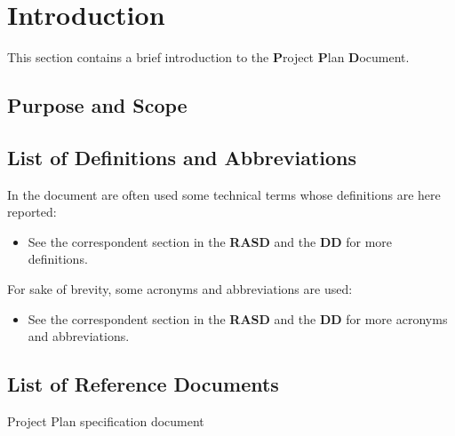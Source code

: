 \section{Introduction}
This section contains a brief introduction to the \textbf{P}roject \textbf{P}lan \textbf{D}ocument.
%
\subsection{Purpose and Scope}
\lipsum[100]
%
\subsection{List of Definitions and Abbreviations}
In the document are often used some technical terms whose definitions are here reported:
\begin{itemize}
	\item See the correspondent section in the \textbf{RASD} and the \textbf{DD} for more definitions.
\end{itemize}
For sake of brevity, some acronyms and abbreviations are used:
\begin{itemize}
	 Project Plan Document.
	 Function Points.
	 Internal Logic File.
	 External Logic File.
	 External Input.
	 External Output.
	 External Inquiry.
	 Constructive Cost Model.
	\item See the correspondent section in the \textbf{RASD} and the \textbf{DD} for more acronyms and abbreviations.
\end{itemize}
%
\subsection{List of Reference Documents}
\begin{itemize}
	 Project Plan specification document
\end{itemize}
%